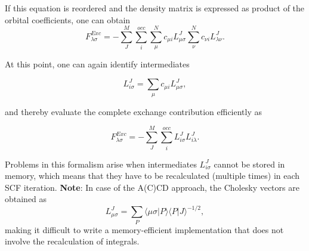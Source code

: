 If this equation is reordered and the density matrix is expressed as product of the orbital coefficients, one can obtain 
\begin{equation}
F^{Exc}_{\lambda\sigma} = -\sum_{J}^{M} \sum_i^{occ} \sum_{\mu}^{N} c_{\mu i} L^J_{\mu\sigma}  \sum_{\nu}^{N}  c_{\nu i}  L^J_{\lambda\nu} .
\end{equation}

At this point, one can again identify intermediates

\begin{equation}
L^J_{i \sigma} = \sum_\mu c_{\mu i} L^J_{\mu \sigma} ,
\end{equation}

and thereby evaluate the complete exchange contribution efficiently as

\begin{equation}
F^{Exc}_{\lambda\sigma} = -\sum_{J}^{M} \sum_i^{occ} L^J_{i \sigma} L^J_{i \lambda} .
\end{equation}

Problems in this formalism arise when intermediates $L^J_{i \sigma}$ cannot be stored in memory, which means that they have to be recalculated (multiple times) in each SCF iteration. \textbf{Note}: In case of the A(C)CD approach, the Cholesky vectors are obtained as 
\begin{equation}
L^J_{\mu \sigma} = \sum_{P} \langle \mu \sigma | P \rangle \langle P | J \rangle^{-1/2} ,
\end{equation}
making it difficult to write a memory-efficient implementation that does not involve the recalculation of integrals.

